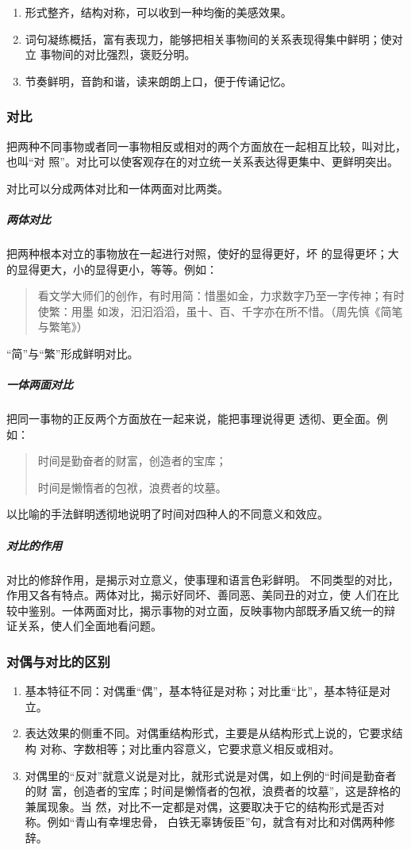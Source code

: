 \documentclass[final,oneside]{ctexbook}
\newenvironment{equotation}{\begin{quotation}\kaishu}{\end{quotation}}
\begin{document}
\begin{enumerate}
  \item 形式整齐，结构对称，可以收到一种均衡的美感效果。

  \item 词句凝练概括，富有表现力，能够把相关事物间的关系表现得集中鲜明；使对立
    事物间的对比强烈，褒贬分明。

  \item 节奏鲜明，音韵和谐，读来朗朗上口，便于传诵记忆。
\end{enumerate}

\subsubsection{对比}

把两种不同事物或者同一事物相反或相对的两个方面放在一起相互比较，叫对比，也叫“对
照”。对比可以使客观存在的对立统一关系表达得更集中、更鲜明突出。

对比可以分成两体对比和一体两面对比两类。

\subparagraph{两体对比}把两种根本对立的事物放在一起进行对照，使好的显得更好，坏
的显得更坏；大的显得更大，小的显得更小，等等。例如：
\begin{equotation}
  看文学大师们的创作，有时用简：惜墨如金，力求数字乃至一字传神；有时使繁：用墨
  如泼，汩汩滔滔，虽十、百、千字亦在所不惜。（周先慎《简笔与繁笔》）
\end{equotation}
“简”与“繁”形成鲜明对比。

\subparagraph{一体两面对比}把同一事物的正反两个方面放在一起来说，能把事理说得更
透彻、更全面。例如：
\begin{equotation}
  时间是勤奋者的财富，创造者的宝库；

  时间是懒惰者的包袱，浪费者的坟墓。
\end{equotation}
以比喻的手法鲜明透彻地说明了时间对四种人的不同意义和效应。

\subparagraph{对比的作用}对比的修辞作用，是揭示对立意义，使事理和语言色彩鲜明。
不同类型的对比，作用又各有特点。两体对比，揭示好同坏、善同恶、美同丑的对立，使
人们在比较中鉴别。一体两面对比，揭示事物的对立面，反映事物内部既矛盾又统一的辩
证关系，使人们全面地看问题。

\subsubsection{对偶与对比的区别}

\begin{enumerate}
  \item 基本特征不同：对偶重“偶”，基本特征是对称；对比重“比”，基本特征是对立。

  \item 表达效果的侧重不同。对偶重结构形式，主要是从结构形式上说的，它要求结构
    对称、字数相等；对比重内容意义，它要求意义相反或相对。

  \item 对偶里的“反对”就意义说是对比，就形式说是对偶，如上例的“时间是勤奋者的财
    富，创造者的宝库；时间是懒惰者的包袱，浪费者的坟墓”，这是辞格的兼属现象。当
    然，对比不一定都是对偶，这要取决于它的结构形式是否对称。例如“青山有幸埋忠骨，
    白铁无辜铸佞臣”句，就含有对比和对偶两种修辞。
\end{enumerate}
\end{document}
